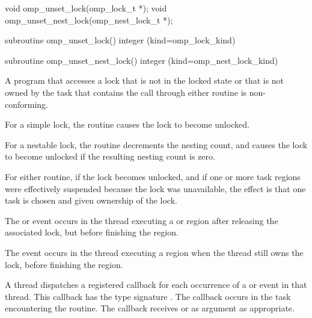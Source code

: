 \format
\begin{ccppspecific}
\begin{ompcFunction}
void omp_unset_lock(omp_lock_t *);
void omp_unset_nest_lock(omp_nest_lock_t *);
\end{ompcFunction}
\end{ccppspecific}


\begin{fortranspecific}
\begin{ompfSubroutine}
subroutine omp_unset_lock()
integer (kind=omp_lock_kind) 

subroutine omp_unset_nest_lock()
integer (kind=omp_nest_lock_kind) 
\end{ompfSubroutine}
\end{fortranspecific}

\constraints
A program that accesses a lock that is not in the locked state or that is
not owned by the task that contains the call through either routine is
non-conforming.


\effect
For a simple lock, the  routine causes the lock to become unlocked.

For a nestable lock, the  routine decrements the nesting
count, and causes the lock to become unlocked if the resulting nesting count is zero.

For either routine, if the lock becomes unlocked, and if one or more task
regions were effectively suspended because the lock was unavailable, the
effect is that one task is chosen and given ownership of the lock.

\events

The  or  event occurs in the thread
executing a  or  region
after releasing the associated lock, but before finishing the region.

The  event occurs in the thread
executing a  region
when the thread still owns the lock,
before finishing the region.


\tools

A thread dispatches a registered 
callback for each occurrence of a  or  event
in that thread.  This callback has the type signature .
The callback occurs in the task encountering
the routine. The callback receives  or
  as  argument as appropriate.

